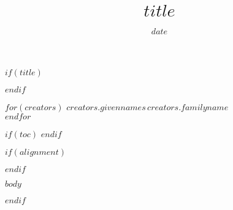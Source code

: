 \documentclass[11pt]{scrartcl}
\title{$title$}
\date{$date$}
\begin{document}
$if(title)$
\maketitle
$endif$

{\small
$for(creators)$
\textsc{$creators.givennames$\,$creators.familyname$}\\
$endfor$
}

$if(toc)$
\tableofcontents
$endif$


$if(alignment)$
\begin{$alignment$}
$endif$

$body$

\end{$alignment$}
$endif$
\end{document}
